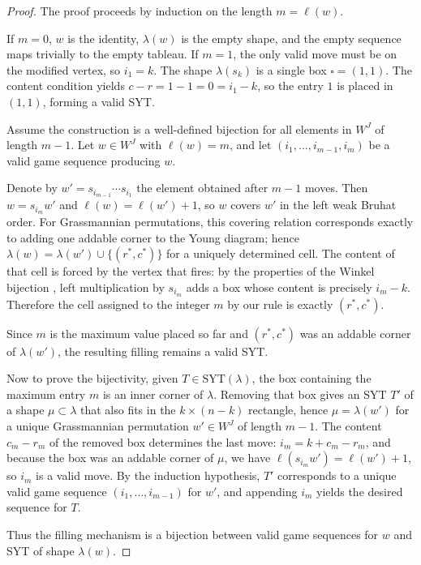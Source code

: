 \documentclass[11pt,a4paper]{amsart}
\theoremstyle{plain}
\theoremstyle{definition}
\theoremstyle{remark}
\begin{document}
\begin{proof}
The proof proceeds by induction on the length $m = \ell(w)$.

If $m=0$, $w$ is the identity, $\lambda(w)$ is the empty shape, and the empty sequence maps trivially to the empty tableau. If $m=1$, the only valid move must be on the modified vertex, so $i_1 = k$. The shape $\lambda(s_k)$ is a single box $\square = (1,1)$. The content condition yields $c - r = 1 - 1 = 0 = i_1 - k$, so the entry $1$ is placed in $(1,1)$, forming a valid SYT.

Assume the construction is a well-defined bijection for all elements in $W^J$ of length $m-1$. Let $w \in W^J$ with $\ell(w) = m$, and let $(i_1, \dots, i_{m-1}, i_m)$ be a valid game sequence producing $w$.

Denote by $w' = s_{i_{m-1}} \cdots s_{i_1}$ the element obtained after $m-1$ moves. Then $w = s_{i_m} w'$ and $\ell(w) = \ell(w') + 1$, so $w$ covers $w'$ in the left weak Bruhat order. For Grassmannian permutations, this covering relation corresponds exactly to adding one addable corner to the Young diagram; hence $\lambda(w) = \lambda(w') \cup \{(r^*, c^*)\}$ for a uniquely determined cell. The content of that cell is forced by the vertex that fires: by the properties of the Winkel bijection \cite{Winkel1996}, left multiplication by $s_{i_m}$ adds a box whose content is precisely $i_m - k$. Therefore the cell assigned to the integer $m$ by our rule is exactly $(r^*, c^*)$.

Since $m$ is the maximum value placed so far and $(r^*, c^*)$ was an addable corner of $\lambda(w')$, the resulting filling remains a valid SYT.

Now to prove the bijectivity, given $T \in \text{SYT}(\lambda)$, the box containing the maximum entry $m$ is an inner corner of $\lambda$. Removing that box gives an SYT $T'$ of a shape $\mu \subset \lambda$ that also fits in the $k \times (n-k)$ rectangle, hence $\mu = \lambda(w')$ for a unique Grassmannian permutation $w' \in W^J$ of length $m-1$. The content $c_m - r_m$ of the removed box determines the last move: $i_m = k + c_m - r_m$, and because the box was an addable corner of $\mu$, we have $\ell(s_{i_m} w') = \ell(w') + 1$, so $i_m$ is a valid move. By the induction hypothesis, $T'$ corresponds to a unique valid game sequence $(i_1, \dots, i_{m-1})$ for $w'$, and appending $i_m$ yields the desired sequence for $T$.

Thus the filling mechanism is a bijection between valid game sequences for $w$ and SYT of shape $\lambda(w)$.
\end{proof}
\end{document}
